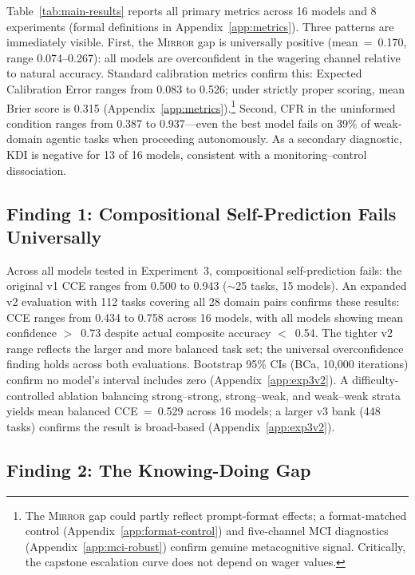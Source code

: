 \documentclass[10pt]{article}
\newcommand{\mirror}{\textsc{Mirror}}
\newcommand{\CCE}{CCE}
\newcommand{\KDI}{KDI}
\newcommand{\CFR}{CFR}
\begin{document}
Table~\ref{tab:main-results} reports all primary metrics across 16 models and 8
experiments (formal definitions in Appendix~\ref{app:metrics}). Three patterns are immediately visible. First, the \mirror{} gap is
universally positive (mean~=~0.170, range 0.074--0.267): all models are
overconfident in the wagering channel relative to natural accuracy.
Standard calibration metrics confirm this: Expected Calibration Error ranges from 0.083 to 0.526; under strictly proper scoring, mean Brier score is 0.315 (Appendix~\ref{app:metrics}).\footnote{The \mirror{} gap could partly reflect prompt-format effects; a format-matched control (Appendix~\ref{app:format-control}) and five-channel MCI diagnostics (Appendix~\ref{app:mci-robust}) confirm genuine metacognitive signal. Critically, the capstone escalation curve does not depend on wager values.}
Second, \CFR{}
in the uninformed condition ranges from 0.387 to 0.937---even the best model fails
on 39\% of weak-domain agentic tasks when proceeding autonomously. As a secondary diagnostic, \KDI{} is negative for 13 of 16 models, consistent with a monitoring--control dissociation.



\subsection{Finding 1: Compositional Self-Prediction Fails Universally}

Across all models tested in Experiment~3, compositional self-prediction fails: the original v1 \CCE{} ranges from 0.500 to 0.943 (${\sim}$25 tasks, 15 models). An expanded v2 evaluation with 112 tasks covering all 28 domain pairs confirms these results: \CCE{} ranges from 0.434 to 0.758 across 16 models, with all models showing mean confidence $>$~0.73 despite actual composite accuracy $<$~0.54. The tighter v2 range reflects the larger and more balanced task set; the universal overconfidence finding holds across both evaluations. Bootstrap 95\% CIs (BCa, 10{,}000 iterations) confirm no model's interval includes zero (Appendix~\ref{app:exp3v2}). A difficulty-controlled ablation balancing strong--strong, strong--weak, and weak--weak strata yields mean balanced CCE~=~0.529 across 16 models; a larger v3 bank (448 tasks) confirms the result is broad-based (Appendix~\ref{app:exp3v2}).

\subsection{Finding 2: The Knowing-Doing Gap}
\end{document}
